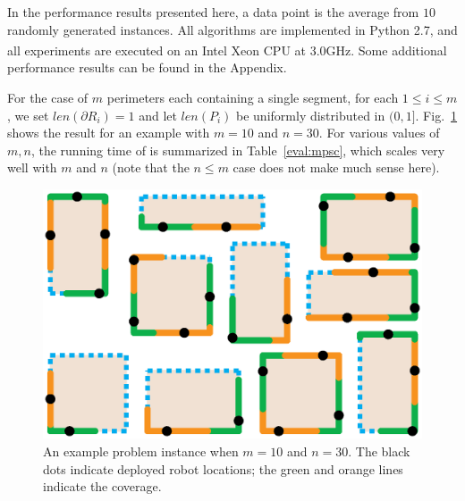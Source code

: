 In the performance results presented here, a data point is the 
average from $10$ randomly generated \opg instances. All algorithms 
are implemented in Python 2.7, and all experiments are executed on 
an Intel\textsuperscript{\textregistered} Xeon\textsuperscript{\textregistered} 
CPU at 3.0GHz. %
Some additional performance results can be found in the Appendix.

For the case of $m$ perimeters each containing a single segment, for 
each $1 \le i \le m$, we set $len(\partial R_i) = 1$ and let $len(P_i)$ 
be uniformly distributed in $(0, 1]$. Fig.~\ref{fig:mpsc-example} shows 
the result for an example with $m = 10$ and $n = 30$. For various values 
of $m, n$, the running time of \algoMRSimple is summarized in 
Table~\ref{eval:mpsc}, which scales very well with $m$ and $n$ (note that 
the $n \le m$ case does not make much sense here). 

\begin{figure}[ht!]
    \vspace*{-3mm}
    \centering
    \includegraphics[keepaspectratio, scale=0.32]{./chapters/opg/figures/mpsc-example.eps}
    \vspace*{-6mm}
    \caption{\label{fig:mpsc-example} 
    An example problem instance when $m = 10$ and $n = 30$. The black dots
		indicate deployed robot locations; the green and orange lines indicate
		the coverage.
		}
    \vspace*{-2mm}
\end{figure}

